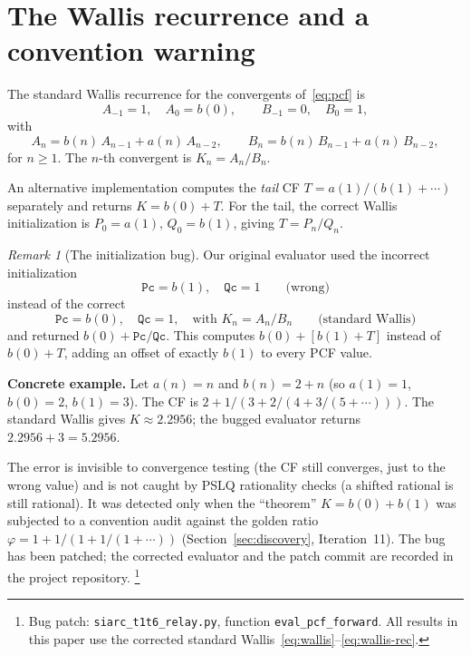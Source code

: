 \documentclass[11pt]{amsart}
\theoremstyle{definition}
\theoremstyle{remark}
\newtheorem{remark}[theorem]{Remark}
\begin{document}
\section{The Wallis recurrence and a convention warning}\label{sec:wallis}

The standard Wallis recurrence for the convergents of~\eqref{eq:pcf} is
\begin{equation}\label{eq:wallis}
  A_{-1}=1,\quad A_0 = b(0),\qquad
  B_{-1}=0,\quad B_0 = 1,
\end{equation}
with
\begin{equation}\label{eq:wallis-rec}
  A_n = b(n)\,A_{n-1} + a(n)\,A_{n-2},\qquad
  B_n = b(n)\,B_{n-1} + a(n)\,B_{n-2},
\end{equation}
for $n\ge 1$.  The $n$-th convergent is $K_n = A_n/B_n$.

An alternative implementation computes the
\emph{tail} CF $T = a(1)/(b(1)+\cdots)$ separately and returns
$K = b(0) + T$.  For the tail, the correct Wallis initialization is
$P_0 = a(1),\, Q_0 = b(1)$, giving $T = P_n/Q_n$.

\begin{remark}[The initialization bug]\label{rem:bug}
  Our original evaluator used the incorrect initialization
  \[
    \texttt{Pc} = b(1),\quad \texttt{Qc} = 1
    \qquad\text{(wrong)}
  \]
  instead of the correct
  \[
    \texttt{Pc} = b(0),\quad \texttt{Qc} = 1,\quad
    \text{with } K_n = A_n/B_n
    \qquad\text{(standard Wallis)}
  \]
  and returned $b(0) + \texttt{Pc}/\texttt{Qc}$.
  This computes $b(0) + [b(1) + T]$ instead of $b(0) + T$, adding
  an offset of exactly $b(1)$ to every PCF value.

  \smallskip\noindent\textbf{Concrete example.}
  Let $a(n) = n$ and $b(n) = 2+n$ (so $a(1)=1$, $b(0)=2$, $b(1)=3$).
  The CF is $2 + 1/(3 + 2/(4 + 3/(5+\cdots)))$.
  The standard Wallis gives $K \approx 2.2956$;
  the bugged evaluator returns $2.2956 + 3 = 5.2956$.

  \smallskip
  The error is invisible to convergence testing
  (the CF still converges, just to the wrong value) and is not
  caught by PSLQ rationality checks (a shifted rational is still
  rational).  It was detected only when the ``theorem''
  $K = b(0)+b(1)$ was subjected to a convention audit against
  the golden ratio $\varphi = 1+1/(1+1/(1+\cdots))$
  (Section~\ref{sec:discovery}, Iteration~11).
  The bug has been patched; the corrected evaluator and the
  patch commit are recorded in the project repository.%
  \footnote{Bug patch: \texttt{siarc\_t1t6\_relay.py}, function
    \texttt{eval\_pcf\_forward}. All results in this paper use
    the corrected standard Wallis~\eqref{eq:wallis}--\eqref{eq:wallis-rec}.}
\end{remark}
\end{document}
